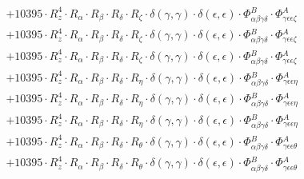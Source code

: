 \documentclass{article}
\begin{document}
\begin{subequations}
\begin{gather}
\begin{array}{c}
 \\[0.2em] 		 + 10395 \cdot R_{z}^{4} \cdot R_{\alpha{}} \cdot R_{\beta{}} \cdot R_{\delta{}} \cdot R_{\zeta{}} \cdot \delta{}\left(\gamma{}, \gamma{}\right) \cdot \delta{}\left(\epsilon{}, \epsilon{}\right) \cdot \Phi{}^{B}_{\alpha{}\beta{}\gamma{}\delta{}} \cdot \Phi{}^{A}_{\gamma{}\epsilon{}\epsilon{}\zeta{}} 
 \\[0.2em] 		 + 10395 \cdot R_{z}^{4} \cdot R_{\alpha{}} \cdot R_{\beta{}} \cdot R_{\delta{}} \cdot R_{\zeta{}} \cdot \delta{}\left(\gamma{}, \gamma{}\right) \cdot \delta{}\left(\epsilon{}, \epsilon{}\right) \cdot \Phi{}^{B}_{\alpha{}\beta{}\gamma{}\delta{}} \cdot \Phi{}^{A}_{\gamma{}\epsilon{}\epsilon{}\zeta{}} 
 \\[0.2em] 		 + 10395 \cdot R_{z}^{4} \cdot R_{\alpha{}} \cdot R_{\beta{}} \cdot R_{\delta{}} \cdot R_{\zeta{}} \cdot \delta{}\left(\gamma{}, \gamma{}\right) \cdot \delta{}\left(\epsilon{}, \epsilon{}\right) \cdot \Phi{}^{B}_{\alpha{}\beta{}\gamma{}\delta{}} \cdot \Phi{}^{A}_{\gamma{}\epsilon{}\epsilon{}\zeta{}} 
 \\[0.2em] 		 + 10395 \cdot R_{z}^{4} \cdot R_{\alpha{}} \cdot R_{\beta{}} \cdot R_{\delta{}} \cdot R_{\eta{}} \cdot \delta{}\left(\gamma{}, \gamma{}\right) \cdot \delta{}\left(\epsilon{}, \epsilon{}\right) \cdot \Phi{}^{B}_{\alpha{}\beta{}\gamma{}\delta{}} \cdot \Phi{}^{A}_{\gamma{}\epsilon{}\epsilon{}\eta{}} 
 \\[0.2em] 		 + 10395 \cdot R_{z}^{4} \cdot R_{\alpha{}} \cdot R_{\beta{}} \cdot R_{\delta{}} \cdot R_{\eta{}} \cdot \delta{}\left(\gamma{}, \gamma{}\right) \cdot \delta{}\left(\epsilon{}, \epsilon{}\right) \cdot \Phi{}^{B}_{\alpha{}\beta{}\gamma{}\delta{}} \cdot \Phi{}^{A}_{\gamma{}\epsilon{}\epsilon{}\eta{}} 
 \\[0.2em] 		 + 10395 \cdot R_{z}^{4} \cdot R_{\alpha{}} \cdot R_{\beta{}} \cdot R_{\delta{}} \cdot R_{\eta{}} \cdot \delta{}\left(\gamma{}, \gamma{}\right) \cdot \delta{}\left(\epsilon{}, \epsilon{}\right) \cdot \Phi{}^{B}_{\alpha{}\beta{}\gamma{}\delta{}} \cdot \Phi{}^{A}_{\gamma{}\epsilon{}\epsilon{}\eta{}} 
 \\[0.2em] 		 + 10395 \cdot R_{z}^{4} \cdot R_{\alpha{}} \cdot R_{\beta{}} \cdot R_{\delta{}} \cdot R_{\theta{}} \cdot \delta{}\left(\gamma{}, \gamma{}\right) \cdot \delta{}\left(\epsilon{}, \epsilon{}\right) \cdot \Phi{}^{B}_{\alpha{}\beta{}\gamma{}\delta{}} \cdot \Phi{}^{A}_{\gamma{}\epsilon{}\epsilon{}\theta{}} 
 \\[0.2em] 		 + 10395 \cdot R_{z}^{4} \cdot R_{\alpha{}} \cdot R_{\beta{}} \cdot R_{\delta{}} \cdot R_{\theta{}} \cdot \delta{}\left(\gamma{}, \gamma{}\right) \cdot \delta{}\left(\epsilon{}, \epsilon{}\right) \cdot \Phi{}^{B}_{\alpha{}\beta{}\gamma{}\delta{}} \cdot \Phi{}^{A}_{\gamma{}\epsilon{}\epsilon{}\theta{}} 

\end{array}
\end{gather}
\end{subequations}
\end{document}
